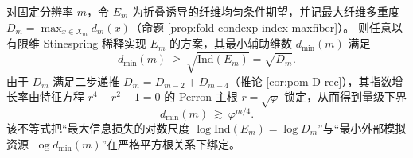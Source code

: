 \begin{corollary}\label{cor:dephys-fold-stinespring-sqrt-law}
对固定分辨率 \(m\)，令 \(E_m\) 为折叠诱导的纤维均匀条件期望，并记最大纤维多重度 \(D_m=\max_{x\in X_m}d_m(x)\)（命题 \ref{prop:fold-condexp-index-maxfiber}）。
则任意以有限维 Stinespring 稀释实现 \(E_m\) 的方案，其最小辅助维数 \(d_{\min}(m)\) 满足
\[
d_{\min}(m)\ \ge\ \sqrt{\mathrm{Ind}(E_m)}=\sqrt{D_m}.
\]
由于 \(D_m\) 满足二步递推 \(D_m=D_{m-2}+D_{m-4}\)（推论 \ref{cor:pom-D-rec}），其指数增长率由特征方程 \(r^4-r^2-1=0\) 的 Perron 主根 \(r=\sqrt{\varphi}\) 锁定，从而得到量级下界
\[
d_{\min}(m)\ \gtrsim\ \varphi^{m/4}.
\]
该不等式把“最大信息损失的对数尺度 \(\log\mathrm{Ind}(E_m)=\log D_m\)”与“最小外部模拟资源 \(\log d_{\min}(m)\)”在严格平方根关系下绑定。
\end{corollary}
